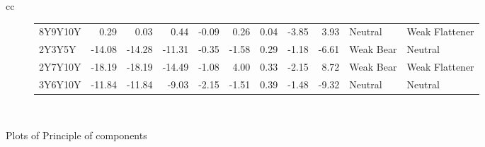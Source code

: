 \documentclass[a4paper,twoside]{report}
\begin{document}
\begin{figure}[htbp]
\begin{tabular}[c]{cc}
\begin{subfigure}[c]{0.5\textwidth}
\begin{adjustbox}{max width=\textwidth}
\begin{tabular}{lrrrrrrrrll}
   8Y9Y10Y &   0.29 &     0.03 &      0.44 &  -0.09 &  0.26 &      0.04 &  -3.85 &     3.93 &      Neutral &    Weak Flattener \\
    2Y3Y5Y & -14.08 &   -14.28 &    -11.31 &  -0.35 & -1.58 &      0.29 &  -1.18 &    -6.61 &    Weak Bear &           Neutral \\
   2Y7Y10Y & -18.19 &   -18.19 &    -14.49 &  -1.08 &  4.00 &      0.33 &  -2.15 &     8.72 &    Weak Bear &    Weak Flattener \\
   3Y6Y10Y & -11.84 &   -11.84 &     -9.03 &  -2.15 & -1.51 &      0.39 &  -1.48 &    -9.32 &      Neutral &           Neutral \\
\hline
\end{tabular}
\end{adjustbox}
 \end{subfigure}\\
 
 
 
\end{tabular}
 \caption{Plots of Principle of components}\label{fig:bubble plots}
 \end{figure}  
 
 
 
 
 
 
 
 



 
\end{document}
